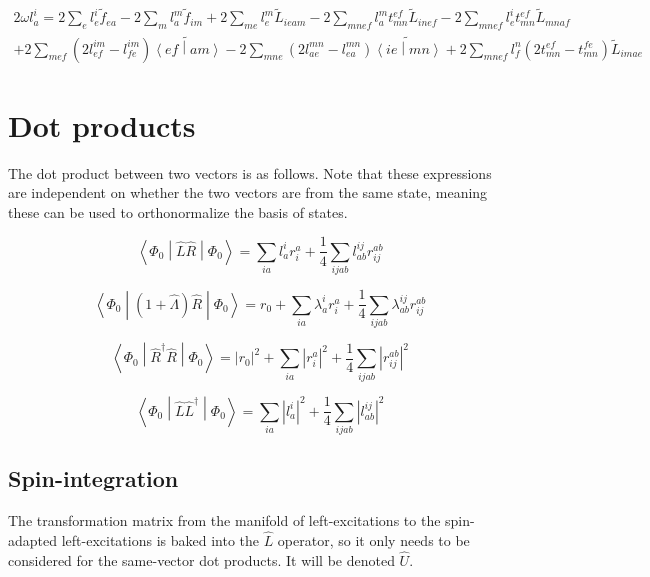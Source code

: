 \documentclass{article}
\begin{document}
\begin{multline}
  2\omega l_a^i = 2\sum_el_e^i\tilde{f}_{ea} - 2\sum_ml_a^m\tilde{f}_{im} + 2\sum_{me}l_e^m\tilde{L}_{ieam} - 2\sum_{mnef}l_a^mt_{mn}^{ef}\tilde{L}_{inef} - 2\sum_{mnef}l_e^it_{mn}^{ef}\tilde{L}_{mnaf}\\
  + 2\sum_{mef}\left(2l_{ef}^{im} - l_{fe}^{im}\right)\widetilde{\left<ef\middle|am\right>} - 2\sum_{mne}\left(2l_{ae}^{mn} - l_{ea}^{mn}\right)\widetilde{\left<ie\middle|mn\right>} + 2\sum_{mnef}l_f^n\left(2t_{mn}^{ef} - t_{mn}^{fe}\right)\tilde{L}_{imae}
\end{multline}

\section{Dot products}
The dot product between two vectors is as follows. Note that these expressions are independent on whether the two vectors are from the same state, meaning these can be used to orthonormalize the basis of states.

\begin{equation}
  \left<\Phi_0\middle|\hat{L}\hat{R}\middle|\Phi_0\right> = \sum_{ia}l_a^ir_i^a + \frac{1}{4}\sum_{ijab}l_{ab}^{ij}r_{ij}^{ab}
\end{equation}

\begin{equation}
  \left<\Phi_0\middle|\left(1 + \hat{\Lambda}\right)\hat{R}\middle|\Phi_0\right> = r_0 + \sum_{ia}\lambda_a^ir_i^a + \frac{1}{4}\sum_{ijab}\lambda_{ab}^{ij}r_{ij}^{ab}
\end{equation}

\begin{equation}
  \left<\Phi_0\middle|\hat{R}^\dagger\hat{R}\middle|\Phi_0\right> = \left|r_0\right|^2 + \sum_{ia}\left|r_i^a\right|^2 + \frac{1}{4} \sum_{ijab}\left|r_{ij}^{ab}\right|^2
\end{equation}

\begin{equation}
  \left<\Phi_0\middle|\hat{L}\hat{L}^\dagger\middle|\Phi_0\right> = \sum_{ia}\left|l_a^i\right|^2 + \frac{1}{4}\sum_{ijab}\left|l_{ab}^{ij}\right|^2
\end{equation}

\subsection{Spin-integration}

The transformation matrix from the manifold of left-excitations to the spin-adapted left-excitations is baked into the $\hat{L}$ operator, so it only needs to be considered for the same-vector dot products. It will be denoted $\hat{U}$.
\end{document}
